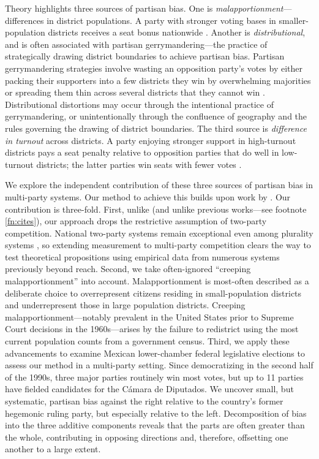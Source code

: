 \documentclass[letter,12pt]{article}
\begin{document}
Theory highlights three sources of partisan bias. One is \emph{malapportionment}---differences in district populations. A party with stronger voting bases in smaller-population districts receives a seat bonus nationwide \citep{JohnstonCreepingMal,jackmanMeasuringBias1994}. Another is \emph{distributional}, and is often associated with partisan gerrymandering---the practice of strategically drawing district boundaries to achieve partisan bias. Partisan gerrymandering strategies involve wasting an opposition party's votes by either packing their supporters into a few districts they win by overwhelming majorities or spreading them thin across several districts that they cannot win \citep{owen.grofman.1988.partisangerrymandering,cox.katz.2002,engstrom2006redisttrictApsr}. Distributional distortions may occur through the intentional practice of gerrymandering, or unintentionally through the confluence of geography and the rules governing the drawing of district boundaries. The third source is \emph{difference in turnout} across districts. A party enjoying stronger support in high-turnout districts pays a seat penalty relative to opposition parties that do well in low-turnout districts; the latter parties win seats with fewer votes \citep{campbellTurnoutBias1996,rosenstone.hansen.1993}.  

We explore the independent contribution of these three sources of partisan bias in multi-party systems. Our method to achieve this builds upon work by \citet{grofman.etalBiasMalapp.1997}. Our contribution is three-fold. First, unlike \citeauthor{grofman.etalBiasMalapp.1997} (and unlike previous works---see footnote \ref{fn:cites}), our approach drops the restrictive assumption of two-party competition. National two-party systems remain exceptional even among plurality systems \citep{cox.1997}, so extending measurement to multi-party competition clears the way to test theoretical propositions using empirical data from numerous systems previously beyond reach. Second, we take often-ignored ``creeping malapportionment'' \citep{JohnstonCreepingMal} into account. Malapportionment is most-often described as a deliberate choice to overrepresent citizens residing in small-population districts and underrepresent those in large population districts. Creeping malapportionment---notably prevalent in the United States prior to Supreme Court decisions in the 1960s---arises by the failure to redistrict using the most current population counts from a government census. Third, we apply these advancements to examine Mexican lower-chamber federal legislative elections to assess our method in a multi-party setting. Since democratizing in the second half of the 1990s, three major parties routinely win most votes, but up to 11 parties have fielded candidates for the C\'amara de Diputados. We uncover small, but systematic, partisan bias against the right relative to the country's former hegemonic ruling party, but especially relative to the left. Decomposition of bias into the three additive components reveals that the parts are often greater than the whole, contributing in opposing directions and, therefore, offsetting one another to a large extent. 
\end{document}
